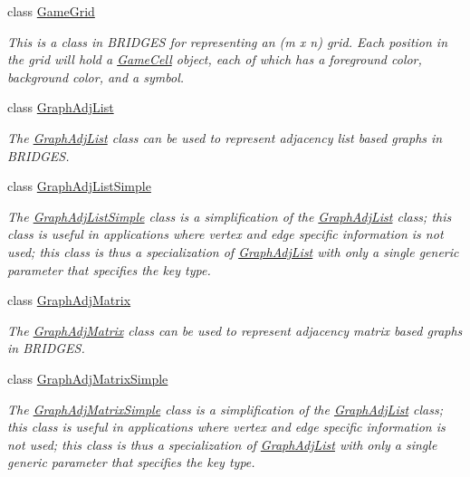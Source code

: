 \begin{DoxyCompactItemize}
class \hyperlink{classbridges_1_1base_1_1_game_grid}{Game\+Grid}
\begin{DoxyCompactList}\small\item\em This is a class in B\+R\+I\+D\+G\+ES for representing an (m x n) grid. Each position in the grid will hold a \hyperlink{classbridges_1_1base_1_1_game_cell}{Game\+Cell} object, each of which has a foreground color, background color, and a symbol. \end{DoxyCompactList}\item 
class \hyperlink{classbridges_1_1base_1_1_graph_adj_list}{Graph\+Adj\+List}
\begin{DoxyCompactList}\small\item\em The \hyperlink{classbridges_1_1base_1_1_graph_adj_list}{Graph\+Adj\+List} class can be used to represent adjacency list based graphs in B\+R\+I\+D\+G\+ES. \end{DoxyCompactList}\item 
class \hyperlink{classbridges_1_1base_1_1_graph_adj_list_simple}{Graph\+Adj\+List\+Simple}
\begin{DoxyCompactList}\small\item\em The \hyperlink{classbridges_1_1base_1_1_graph_adj_list_simple}{Graph\+Adj\+List\+Simple} class is a simplification of the \hyperlink{classbridges_1_1base_1_1_graph_adj_list}{Graph\+Adj\+List} class; this class is useful in applications where vertex and edge specific information is not used; this class is thus a specialization of \hyperlink{classbridges_1_1base_1_1_graph_adj_list}{Graph\+Adj\+List} with only a single generic parameter that specifies the key type. \end{DoxyCompactList}\item 
class \hyperlink{classbridges_1_1base_1_1_graph_adj_matrix}{Graph\+Adj\+Matrix}
\begin{DoxyCompactList}\small\item\em The \hyperlink{classbridges_1_1base_1_1_graph_adj_matrix}{Graph\+Adj\+Matrix} class can be used to represent adjacency matrix based graphs in B\+R\+I\+D\+G\+ES. \end{DoxyCompactList}\item 
class \hyperlink{classbridges_1_1base_1_1_graph_adj_matrix_simple}{Graph\+Adj\+Matrix\+Simple}
\begin{DoxyCompactList}\small\item\em The \hyperlink{classbridges_1_1base_1_1_graph_adj_matrix_simple}{Graph\+Adj\+Matrix\+Simple} class is a simplification of the \hyperlink{classbridges_1_1base_1_1_graph_adj_list}{Graph\+Adj\+List} class; this class is useful in applications where vertex and edge specific information is not used; this class is thus a specialization of \hyperlink{classbridges_1_1base_1_1_graph_adj_list}{Graph\+Adj\+List} with only a single generic parameter that specifies the key type. \end{DoxyCompactList}\item 

\end{DoxyCompactItemize}
